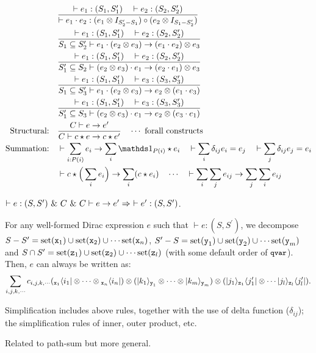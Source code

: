 \begin{align*}
	&\frac{\vdash e_1 : (S_1,S_1^\prime)\quad \vdash e_2 : (S_2,S_2^\prime)}{\vdash e_1\cdot e_2 : (e_1\otimes I_{S_2^\prime - S_1})\circ(e_2\otimes I_{S_1-S_2^\prime})}\\
	&\frac{\vdash e_1 : (S_1,S_1^\prime)\quad \vdash e_2 : (S_2,S_2^\prime) }{S_1\subseteq S_2^\prime\vdash e_1\cdot(e_2\otimes e_3)\ra (e_1\cdot e_2)\otimes e_3}\\
	&\frac{\vdash e_1 : (S_1,S_1^\prime)\quad \vdash e_2 : (S_2,S_2^\prime) }{S_1^\prime\subseteq S_2\vdash (e_2\otimes e_3)\cdot e_1\ra (e_2\cdot e_1)\otimes e_3}\\
	&\frac{\vdash e_1 : (S_1,S_1^\prime)\quad \vdash e_3 : (S_3,S_3^\prime) }{S_1\subseteq S_3^\prime\vdash e_1\cdot(e_2\otimes e_3)\ra e_2 \otimes (e_1\cdot e_3)}\\
	&\frac{\vdash e_1 : (S_1,S_1^\prime)\quad \vdash e_3 : (S_3,S_3^\prime) }{S_1^\prime\subseteq S_3\vdash (e_2\otimes e_3)\cdot e_1 \ra e_2 \otimes (e_3\cdot e_1)}\\
	\text{Structural:}\quad
	&\frac{C\vdash e\ra e^\prime}{C\vdash c \star e \ra c \star e^\prime}\quad \cdots\ \text{forall constructs}\\
	\text{Summation:}\quad
	&\vdash \sum_{i : P(i)} e_i \ra \sum_i \idfun{P(i)}\star e_i \quad
	\vdash\sum_{i}\delta_{ij}e_i = e_j \quad \vdash\sum_{j}\delta_{ij}e_j = e_i \\
	&\vdash c \star \Big(\sum_i e_i\Big) \ra \sum_i (c \star e_i)\quad\cdots\quad
	\vdash \sum_i \sum_j e_{ij} \ra \sum_j\sum_i e_{ij}
	\\
\end{align*}

\begin{definition}
	$\vdash e: (S,S^\prime)\ \&\ C\ \&\ C\vdash e\ra e^\prime \Rightarrow\ \vdash e^\prime : (S,S^\prime)$. 
\end{definition}

\begin{definition}
	For any well-formed Dirac expression $e$ such that $\vdash e : (S, S^\prime)$, we decompose $S - S^\prime = \pset{\mx_1} \cup \pset{\mx_2}\cup \cdots \pset{\mx_n}$, $S^\prime - S = \pset{\my_1} \cup \pset{\my_2}\cup \cdots \pset{\my_m}$ and $S \cap S^\prime = \pset{\mz_1} \cup \pset{\mz_2}\cup \cdots \pset{\mz_l}$ (with some default order of $\text{\small\ttfamily{qvar}}$).
	Then, $e$ can always be written as: 
	$$\sum_{i,j,k,\cdots} c_{i,j,k,\cdots} ({}_{\mx_1}\<i_1|\otimes\cdots\otimes {}_{\mx_n}\<i_n|)\otimes (|k_1\>_{\my_1}\otimes\cdots\otimes|k_m\>_{\my_m})\otimes (|j_1\>_{\mz_1}\<j_1^\prime|\otimes\cdots |j_l\>_{\mz_l}\<j_l^\prime|).$$
	
	Simplification includes above rules, together with the use of delta function ($\delta_{ij}$); the simplification rules of inner, outer product, etc.
	
	Related to path-sum but more general.
\end{definition}

